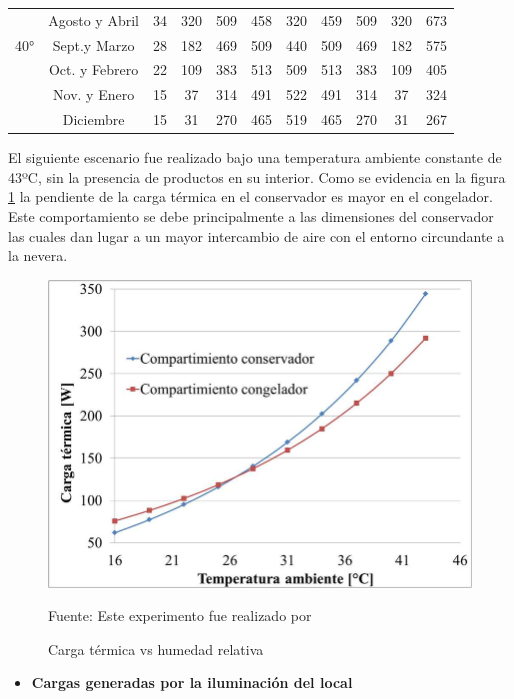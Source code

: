 \begin{itemize}
\begin{table}[H]
\begin{tabular}{@{}lcccccccccc@{}}
		& Agosto y Abril       & 34    & 320    & 509    & 458    & 320   & 459   & 509   & 320   & 673      \\
		\multicolumn{1}{c}{40°}           & Sept.y Marzo         & 28    & 182    & 469    & 509    & 440   & 509   & 469   & 182   & 575      \\
		& Oct. y Febrero       & 22    & 109    & 383    & 513    & 509   & 513   & 383   & 109   & 405      \\
		& Nov. y   Enero       & 15    & 37     & 314    & 491    & 522   & 491   & 314   & 37    & 324      \\
		& Diciembre            & 15    & 31     & 270    & 465    & 519   & 465   & 270   & 31    & 267      \\ \bottomrule
	\end{tabular}
\end{table}
	El siguiente escenario fue realizado bajo una temperatura ambiente constante de 43ºC, sin la presencia de productos en su interior. Como se evidencia en la figura \ref{fig:cargas-ter} la pendiente de la carga térmica en el conservador es mayor en el congelador. Este comportamiento se debe principalmente a las dimensiones del conservador las cuales dan lugar a un mayor intercambio de aire con el entorno circundante a la nevera.  \cite{rio}

\begin{figure}[H]
	\centering
	\includegraphics[width=0.46\linewidth]{figures/cargas-ter}
	\caption{Carga térmica vs humedad relativa}
	\label{fig:cargas-ter} Fuente: Este experimento fue realizado por 
\end{figure}




\label{table:carrier}
\begin{itemize}
	\item \textbf{Cargas generadas por la iluminación del local}
	

\end{itemize}
\end{itemize}
